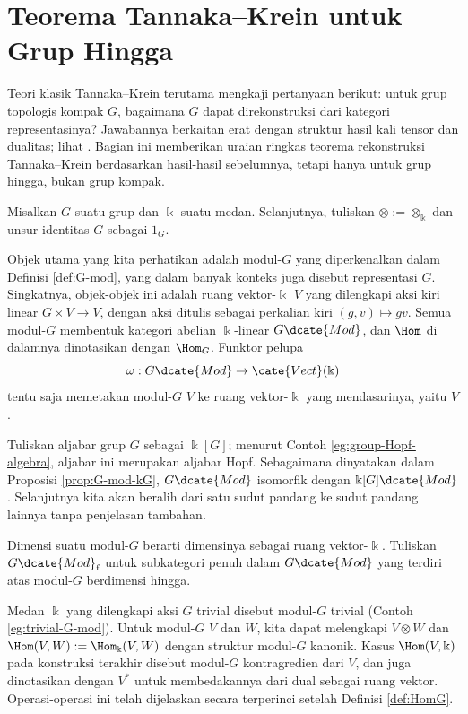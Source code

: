 \section{Teorema Tannaka--Krein untuk Grup Hingga}\label{sec:TK}
Teori klasik Tannaka--Krein \cite{Ta38, Kr49} terutama mengkaji pertanyaan
berikut: untuk grup topologis kompak $G$, bagaimana $G$ dapat
direkonstruksi dari kategori representasinya? Jawabannya berkaitan erat dengan
struktur hasil kali tensor dan dualitas; lihat \cite[\S 4.3]{FL14}. Bagian ini
memberikan uraian ringkas teorema rekonstruksi Tannaka--Krein berdasarkan
hasil-hasil sebelumnya, tetapi hanya untuk grup hingga, bukan grup kompak.

Misalkan $G$ suatu grup dan $\Bbbk$ suatu medan. Selanjutnya, tuliskan
$\otimes := \otimes_{\Bbbk}$ dan unsur identitas $G$ sebagai $1_G$.

Objek utama yang kita perhatikan adalah modul-$G$ yang diperkenalkan dalam Definisi \ref{def:G-mod}, yang dalam banyak konteks juga disebut representasi $G$. Singkatnya, objek-objek ini adalah ruang vektor-$\Bbbk$ $V$ yang dilengkapi aksi kiri linear $G \times V \to V$, dengan aksi ditulis sebagai perkalian kiri $(g, v) \mapsto gv$. Semua modul-$G$ membentuk kategori abelian $\Bbbk$-linear $G\dcate{Mod}$, dan $\Hom$ di dalamnya dinotasikan dengan $\Hom_G$. Funktor pelupa
\[ \omega: G\dcate{Mod} \to \cate{Vect}(\Bbbk) \]
tentu saja memetakan modul-$G$ $V$ ke ruang vektor-$\Bbbk$ yang mendasarinya, yaitu $V$.

Tuliskan aljabar grup $G$ sebagai $\Bbbk[G]$; menurut
Contoh \ref{eg:group-Hopf-algebra}, aljabar ini merupakan aljabar Hopf.
Sebagaimana dinyatakan dalam Proposisi \ref{prop:G-mod-kG},
$G\dcate{Mod}$ isomorfik dengan $\Bbbk[G]\dcate{Mod}$. Selanjutnya kita akan
beralih dari satu sudut pandang ke sudut pandang lainnya tanpa penjelasan
tambahan.

\begin{convention}
	Dimensi suatu modul-$G$ berarti dimensinya sebagai ruang vektor-$\Bbbk$. Tuliskan $G\dcate{Mod}_{\mathrm{f}}$ untuk subkategori penuh dalam $G\dcate{Mod}$ yang terdiri atas modul-$G$ berdimensi hingga.
\end{convention}

Medan $\Bbbk$ yang dilengkapi aksi $G$ trivial disebut modul-$G$ trivial
(Contoh \ref{eg:trivial-G-mod}). Untuk modul-$G$ $V$ dan $W$, kita dapat
melengkapi $V \otimes W$ dan $\Hom(V, W) := \Hom_{\Bbbk}(V, W)$ dengan
struktur modul-$G$ kanonik. Kasus $\Hom(V, \Bbbk)$ pada konstruksi terakhir
disebut modul-$G$ kontragredien dari $V$, dan juga dinotasikan dengan $V^*$
untuk membedakannya dari dual sebagai ruang vektor. Operasi-operasi ini telah
dijelaskan secara terperinci setelah Definisi \ref{def:HomG}.

